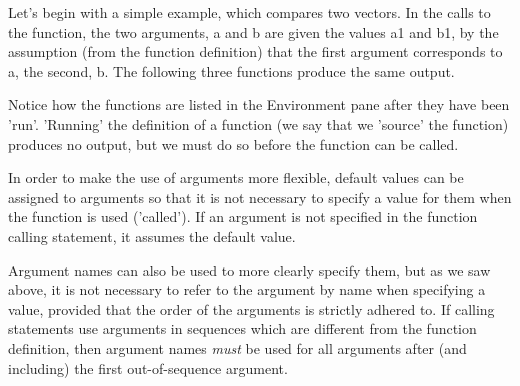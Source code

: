 \documentclass[titlepage]{book}\usepackage{knitr}
\begin{document}
Let's begin with a simple example, which compares two vectors. In the calls to the function, the two arguments, a and b are given the values a1 and b1, by the assumption (from the function definition) that the first argument corresponds to a, the second, b. The following three functions produce the same output.
\begin{knitrout}
\color{fgcolor}\begin{kframe}
\begin{alltt}
  \hlkwb{<-} \hlstd{(}\hlstd{,} \hlstd{)\{}
    \hlopt{==}                                    
 \hlstd{\}}

  \hlkwb{<-} \hlstd{(}\hlstd{,} \hlstd{)\{}
    \hlopt{==}                             
 \hlstd{\}}
  \hlkwb{<-} \hlstd{(}\hlstd{,} \hlstd{)\{}
    \hlkwb{<-}  \hlopt{==} 
                                   
 \hlstd{\}}

 \hlkwb{<-} \hlstd{(}\hlstd{,} \hlstd{,} \hlstd{)}
 \hlkwb{<-} \hlstd{(}\hlstd{,} \hlstd{,} \hlstd{)}

\end{alltt}
\end{kframe}
\end{knitrout}
Notice how the functions are listed in the Environment pane after they have been 'run'. 'Running' the definition of a function (we say that we 'source' the function) produces no output, but we must do so before the function can be called.

In order to make the use of arguments more flexible, default values can be assigned to arguments so that it is not necessary to specify a value for them when the function is used ('called'). If an argument is not specified in the function calling statement, it assumes the default value.

Argument names can also be used to more clearly specify them, but as we saw above, it is not necessary to refer to the argument by  name when specifying a value, provided that the order of the arguments is strictly adhered to. If calling statements use  arguments in sequences which are different from the function definition, then argument names \emph{must} be used for all arguments after (and including) the first out-of-sequence argument.
\end{document}
